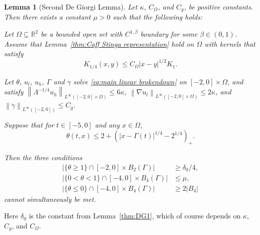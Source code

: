 \documentclass[11pt]{amsart}
\newtheorem{lemma}[theorem]{Lemma}
\theoremstyle{remark}
\theoremstyle{definition}
\newcommand{\R}{\mathbb{R}}
\newcommand{\norm}[1]{\left\lVert#1\right\rVert}
\newcommand{\paren}[1]{\left( #1 \right)}
\newcommand{\abs}[1]{\left\lvert #1 \right\rvert}
\newcommand{\grad}{\nabla}
\newcommand{\ulow}{u_l}
\newcommand{\uhigh}{u_h}
\newcommand{\Cgamma}{C_g}
\newcommand{\Comega}{C_\Omega}
\begin{document}
\begin{lemma}[Second De Giorgi Lemma] \label{thm:DG2}
Let $\kappa$, $\Comega$, and $\Cgamma$, be positive constants. Then there exists a constant $\mu>0$ such that the following holds:

Let $\Omega \subseteq \R^2$ be a bounded open set with $C^{1,\beta}$ boundary for some $\beta \in (0,1)$.  Assume that Lemma~\ref{thm:Caff Stinga representation} hold on $\Omega$ with kernels that satisfy
\[ K_{1/4}(x,y) \leq \Comega |x-y|^{1/2} K_{1}. \]

Let $\theta$, $\ulow$, $\uhigh$, $\Gamma$ and $\gamma$ solve \eqref{eq:main linear brokendown} on $[-2,0]\times\Omega$, and satisfy $\norm{\Lambda^{-1/4} \uhigh}_{L^\infty([-2,0]\times\Omega)} \leq 6 \kappa$, $\norm{\grad \ulow}_{L^\infty([-2,0]\times\Omega)} \leq 2\kappa$, and $\norm{\dot{\gamma}}_{L^\infty([-2,0])} \leq \Cgamma$.  

Suppose that for $t \in [-5,0]$ and any $x \in \Omega$,
\[ \theta(t,x) \leq 2 + \paren{|x-\Gamma(t)|^{1/4}-2^{1/4}}_+. \]

Then the three conditions
\begin{align} 
\abs{\{\theta \geq 1\} \cap [-2,0]\times B_2(\Gamma)} &\geq \delta_0/4, \label{mass assumption above} \\
\abs{\{0 < \theta < 1\} \cap [-4,0]\times B_4(\Gamma)} &\leq \mu, \nonumber \\
\abs{\{\theta \leq 0\} \cap [-4,0]\times B_4(\Gamma)} &\geq 2 |B_4| \label{mass assumption below}
\end{align}
cannot simultaneously be met.  
\end{lemma}

Here $\delta_0$ is the constant from Lemma~\ref{thm:DG1}, which of course depends on $\kappa$, $\Cgamma$, and $\Comega$.  
\end{document}
